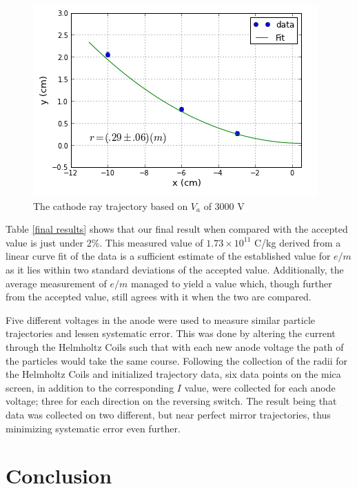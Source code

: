 \documentclass[prb,preprint]{revtex4-1}
\begin{document}
	\begin{figure}[h!]
		\begin{minipage}{.5\textwidth}
			\includegraphics[width=\linewidth]{CircFinal.png}
		\end{minipage}
		\caption{The cathode ray trajectory based on $V_a$ of 3000 V}
		\label{LSF:curvature}
	\end{figure}
	
\newpage

Table \ref{final results} shows that our final result when compared with the accepted value is just under 2\%. This measured value of $1.73\times10^{11}$ C/kg derived from a linear curve fit of the data is a sufficient estimate of the established value for $e/m$ as it lies within two standard deviations of the accepted value. Additionally, the average measurement of $e/m$ managed to yield a value which, though further from the accepted value, still agrees with it when the two are compared.

Five different voltages in the anode were used to measure similar particle trajectories and lessen systematic error. This was done by altering the current through the Helmholtz Coils such that with each new anode voltage the path of the particles would take the same course. Following the collection of the radii for the Helmholtz Coils and initialized trajectory data, six data points on the mica screen, in addition to the corresponding $I$ value, were collected for each anode voltage; three for each direction on the reversing switch. The result being that data was collected on two different, but near perfect mirror trajectories, thus minimizing systematic error even further. 

\section{Conclusion}
\end{document}
